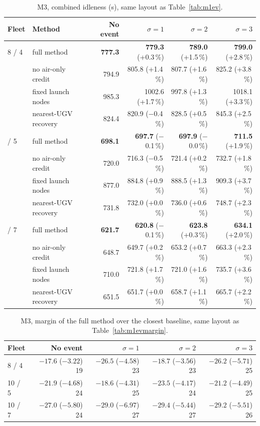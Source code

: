 \documentclass[11pt]{article}
\theoremstyle{definition}
\theoremstyle{plain}
\begin{document}
\begin{table}[H]
\centering
\small
\caption{M3, combined idleness (s), same layout as Table~\ref{tab:m1ev}.}
\label{tab:m3ev}
\begin{tabular}{llrrrr}
\toprule
Fleet & Method & No event & $\sigma = 1$ & $\sigma = 2$ & $\sigma = 3$ \\
\midrule
8 / 4 & full method & \textbf{777.3} & \textbf{779.3} (+0.3\,\%) & \textbf{789.0} (+1.5\,\%) & \textbf{799.0} (+2.8\,\%) \\
 & no air-only credit & 794.9 & 805.8 (+1.4\,\%) & 807.7 (+1.6\,\%) & 825.2 (+3.8\,\%) \\
 & fixed launch nodes & 985.3 & 1002.6 (+1.7\,\%) & 997.8 (+1.3\,\%) & 1018.1 (+3.3\,\%) \\
 & nearest-UGV recovery & 824.4 & 820.9 ($-$0.4\,\%) & 828.5 (+0.5\,\%) & 845.3 (+2.5\,\%) \\
\addlinespace
10 / 5 & full method & \textbf{698.1} & \textbf{697.7} ($-$0.1\,\%) & \textbf{697.9} ($-$0.0\,\%) & \textbf{711.5} (+1.9\,\%) \\
 & no air-only credit & 720.0 & 716.3 ($-$0.5\,\%) & 721.4 (+0.2\,\%) & 732.7 (+1.8\,\%) \\
 & fixed launch nodes & 877.0 & 884.8 (+0.9\,\%) & 888.5 (+1.3\,\%) & 909.3 (+3.7\,\%) \\
 & nearest-UGV recovery & 731.8 & 732.0 (+0.0\,\%) & 736.0 (+0.6\,\%) & 748.7 (+2.3\,\%) \\
\addlinespace
10 / 7 & full method & \textbf{621.7} & \textbf{620.8} ($-$0.1\,\%) & \textbf{623.8} (+0.3\,\%) & \textbf{634.1} (+2.0\,\%) \\
 & no air-only credit & 648.7 & 649.7 (+0.2\,\%) & 653.2 (+0.7\,\%) & 663.3 (+2.3\,\%) \\
 & fixed launch nodes & 710.0 & 721.8 (+1.7\,\%) & 721.0 (+1.6\,\%) & 735.7 (+3.6\,\%) \\
 & nearest-UGV recovery & 651.5 & 651.7 (+0.0\,\%) & 658.7 (+1.1\,\%) & 665.7 (+2.2\,\%) \\
\bottomrule
\end{tabular}
\end{table}

\begin{table}[H]
\centering
\small
\caption{M3, margin of the full method over the closest baseline, same layout as Table~\ref{tab:m1evmargin}.}
\label{tab:m3evmargin}
\begin{tabular}{lrrrr}
\toprule
Fleet & No event & $\sigma = 1$ & $\sigma = 2$ & $\sigma = 3$ \\
\midrule
8 / 4 & $-17.6$ ($-3.22$) 19 & $-26.5$ ($-4.58$) 23 & $-18.7$ ($-3.56$) 23 & $-26.2$ ($-5.71$) 25 \\
10 / 5 & $-21.9$ ($-4.68$) 24 & $-18.6$ ($-4.31$) 25 & $-23.5$ ($-4.17$) 24 & $-21.2$ ($-4.49$) 25 \\
10 / 7 & $-27.0$ ($-5.80$) 24 & $-29.0$ ($-6.97$) 27 & $-29.4$ ($-5.44$) 27 & $-29.2$ ($-5.51$) 26 \\
\bottomrule
\end{tabular}
\end{table}
\end{document}
